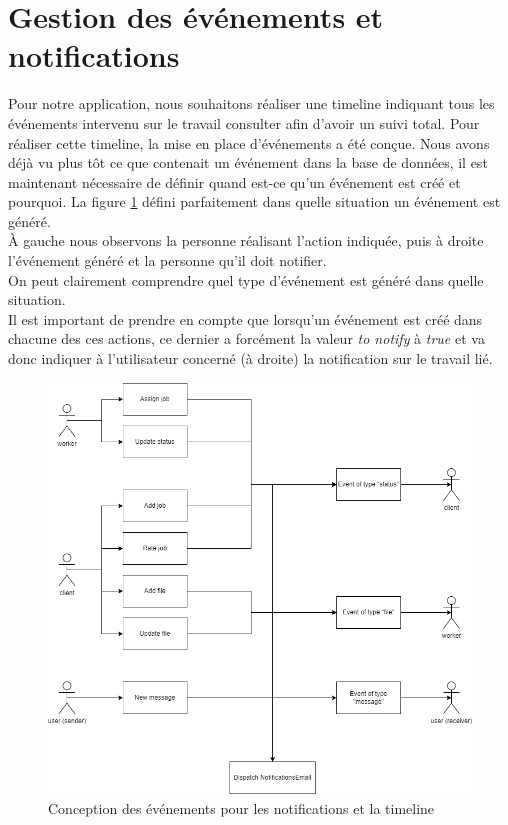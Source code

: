 \documentclass[
    iai, %
    il, %
]{heig-tb}
\begin{document}
\section{Gestion des événements et notifications}
Pour notre application, nous souhaitons réaliser une timeline indiquant tous les événements intervenu sur le travail consulter afin d'avoir un suivi total. Pour réaliser cette timeline, la mise en place d'événements a été conçue. Nous avons déjà vu plus tôt ce que contenait un événement dans la base de données, il est maintenant nécessaire de définir quand est-ce qu'un événement est créé et pourquoi. La figure \ref{events-email-scenario.drawio} défini parfaitement dans quelle situation un événement est généré. \\
À gauche nous observons la personne réalisant l'action indiquée, puis à droite l'événement généré et la personne qu'il doit notifier. \\
On peut clairement comprendre quel type d'événement est généré dans quelle situation. \\
Il est important de prendre en compte que lorsqu'un événement est créé dans chacune des ces actions, ce dernier a forcément la valeur \emph{to notify} à \emph{true} et va donc indiquer à l'utilisateur concerné (à droite) la notification sur le travail lié.

\begin{center}
    \begin{figure}
        \includegraphics[width=\textwidth]{./assets/figures/events-email-scenario.drawio.png}
        \caption{Conception des événements pour les notifications et la timeline \label{events-email-scenario.drawio}}
    \end{figure}
\end{center}
\end{document}
